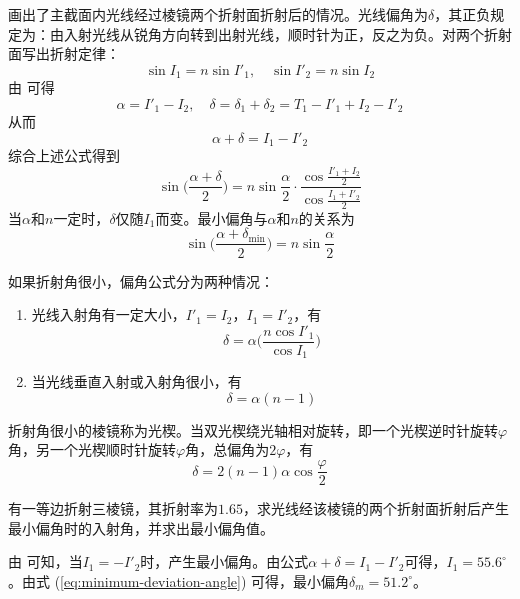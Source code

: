 \documentclass[cn,10pt,chinesefont=founder,math=newtx,cite=super,twoside]{elegantbook}
\begin{document}
 画出了主截面内光线经过棱镜两个折射面折射后的情况。光线偏角为$\delta$，其正负规定为：由入射光线从锐角方向转到出射光线，顺时针为正，反之为负。对两个折射面写出折射定律：
\begin{equation}
\sin I_1=n\sin I'_1,\quad
\sin I'_2=n\sin I_2
\end{equation}
由 可得
\begin{equation}
\alpha=I'_1-I_2,\quad\delta=\delta_1+\delta_2=T_1-I'_1+I_2-I'_2
\end{equation}
从而
\begin{equation}
\alpha+\delta=I_1-I'_2
\end{equation}
综合上述公式得到
\begin{equation}
\sin\bigg(\frac{\alpha+\delta}{2}\bigg)=n\sin\frac{\alpha}{2}\cdot\frac{\cos\frac{I'_1+I_2}{2}}{\cos\frac{I_1+I'_2}{2}}
\end{equation}
当$\alpha$和$n$一定时，$\delta$仅随$I_1$而变。最小偏角与$\alpha$和$n$的关系为
\begin{equation}
\sin\bigg(\frac{\alpha+\delta_{\mathrm{min}}}{2}\bigg)=n\sin\frac{\alpha}{2}
\label{eq:minimum-deviation-angle}
\end{equation}

如果折射角很小，偏角公式分为两种情况：
\begin{enumerate}
	\item 光线入射角有一定大小，$I'_1=I_2$，$I_1=I'_2$，有
	\begin{equation}
	\delta=\alpha\bigg(\frac{n\cos I'_1}{\cos I_1}\bigg)
	\end{equation}
	\item 当光线垂直入射或入射角很小，有
	\begin{equation}
	\delta=\alpha(n-1)
	\end{equation}
\end{enumerate}

折射角很小的棱镜称为光楔。当双光楔绕光轴相对旋转，即一个光楔逆时针旋转$\varphi$角，另一个光楔顺时针旋转$\varphi$角，总偏角为$2\varphi$，有
\begin{equation}
\delta=2(n-1)\alpha\cos\frac{\varphi}{2}
\end{equation}

\begin{problem}
	有一等边折射三棱镜，其折射率为$1.65$，求光线经该棱镜的两个折射面折射后产生最小偏角时的入射角，并求出最小偏角值。
\end{problem}
\begin{solution}
	由 可知，当$I_1=-I'_2$时，产生最小偏角。由公式$\alpha+\delta=I_1-I'_2$可得，$I_1=55.6^{\circ}$。由式 (\ref{eq:minimum-deviation-angle}) 可得，最小偏角$\delta_m=51.2^{\circ}$。
\end{solution}
\end{document}
